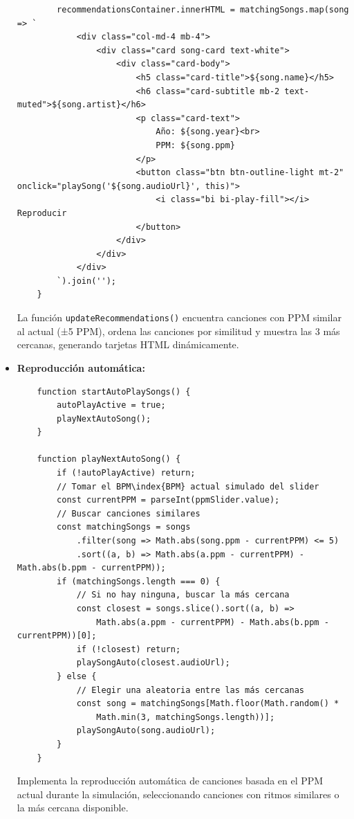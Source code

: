 \documentclass[a4paper,12pt]{article}
\begin{document}
\begin{itemize}
\begin{verbatim}
        recommendationsContainer.innerHTML = matchingSongs.map(song => `
            <div class="col-md-4 mb-4">
                <div class="card song-card text-white">
                    <div class="card-body">
                        <h5 class="card-title">${song.name}</h5>
                        <h6 class="card-subtitle mb-2 text-muted">${song.artist}</h6>
                        <p class="card-text">
                            Año: ${song.year}<br>
                            PPM: ${song.ppm}
                        </p>
                        <button class="btn btn-outline-light mt-2" onclick="playSong('${song.audioUrl}', this)">
                            <i class="bi bi-play-fill"></i> Reproducir
                        </button>
                    </div>
                </div>
            </div>
        `).join('');
    }
    \end{verbatim}
    La función \texttt{updateRecommendations()} encuentra canciones con PPM similar al actual (±5 PPM), ordena las canciones por similitud y muestra las 3 más cercanas, generando tarjetas HTML dinámicamente.

    \item \textbf{Reproducción automática:}
    \begin{verbatim}
    function startAutoPlaySongs() {
        autoPlayActive = true;
        playNextAutoSong();
    }

    function playNextAutoSong() {
        if (!autoPlayActive) return;
        // Tomar el BPM\index{BPM} actual simulado del slider
        const currentPPM = parseInt(ppmSlider.value);
        // Buscar canciones similares
        const matchingSongs = songs
            .filter(song => Math.abs(song.ppm - currentPPM) <= 5)
            .sort((a, b) => Math.abs(a.ppm - currentPPM) - Math.abs(b.ppm - currentPPM));
        if (matchingSongs.length === 0) {
            // Si no hay ninguna, buscar la más cercana
            const closest = songs.slice().sort((a, b) => 
                Math.abs(a.ppm - currentPPM) - Math.abs(b.ppm - currentPPM))[0];
            if (!closest) return;
            playSongAuto(closest.audioUrl);
        } else {
            // Elegir una aleatoria entre las más cercanas
            const song = matchingSongs[Math.floor(Math.random() * 
                Math.min(3, matchingSongs.length))];
            playSongAuto(song.audioUrl);
        }
    }
    \end{verbatim}
    Implementa la reproducción automática de canciones basada en el PPM actual durante la simulación, seleccionando canciones con ritmos similares o la más cercana disponible.


\end{itemize}
\end{document}
